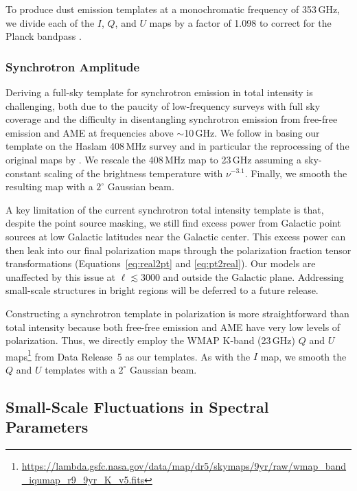 \documentclass[twocolumn]{aastex631}
\begin{document}
To produce dust emission templates at a monochromatic frequency of 353\,GHz, we divide each of the $I$, $Q$, and $U$ maps by a factor of 1.098 to correct for the Planck bandpass \citep[][Table~2]{planck2016-l11A}.

\subsubsection{Synchrotron Amplitude}
Deriving a full-sky template for synchrotron emission in total intensity is challenging, both due to the paucity of low-frequency surveys with full sky coverage and the difficulty in disentangling synchrotron emission from free-free emission and AME at frequencies above $\sim$10\,GHz. We follow \citet{Thorne:2017} in basing our template on the Haslam 408\,MHz survey \citep{Haslam:1982} and in particular the reprocessing of the original maps by \citet{Remazeilles:2015}. We rescale the 408\,MHz map to 23\,GHz assuming a sky-constant scaling of the brightness temperature with $\nu^{-3.1}$. Finally, we smooth the resulting map with a $2^\circ$ Gaussian beam.

A key limitation of the current synchrotron total intensity template is that, despite the point source masking, we still find excess power from Galactic point sources at low Galactic latitudes near the Galactic center. This excess power can then leak into our final polarization maps through the polarization fraction tensor transformations (Equations~\eqref{eq:real2pt} and \eqref{eq:pt2real}). Our models are unaffected by this issue at $\ell \lesssim 3000$ and outside the Galactic plane. Addressing small-scale structures in bright regions will be deferred to a future release. %

Constructing a synchrotron template in polarization is more straightforward than total intensity because both free-free emission and AME have very low levels of polarization. Thus, we directly employ the WMAP K-band (23\,GHz) $Q$ and $U$ maps\footnote{\url{https://lambda.gsfc.nasa.gov/data/map/dr5/skymaps/9yr/raw/wmap_band_iqumap_r9_9yr_K_v5.fits}} from Data Release~5 as our templates. As with the $I$ map, we smooth the $Q$ and $U$ templates with a $2^\circ$ Gaussian beam.

\subsection{Small-Scale Fluctuations in Spectral Parameters} \label{sec:spec_params}
\end{document}
